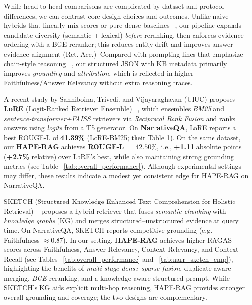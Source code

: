 \documentclass[10pt,twocolumn,letterpaper]{article}
\begin{document}
\vspace{0.5em}
While head‑to‑head comparisons are complicated by dataset and protocol differences, we can contrast core design choices and outcomes. Unlike naive hybrids that linearly mix scores or pure dense baselines ~\cite{gao2021retrieval}, our pipeline expands candidate diversity (semantic + lexical) \emph{before} reranking, then enforces evidence ordering with a BGE reranker; this reduces entity drift and improves answer–evidence alignment (Ret. Acc.). Compared with prompting lines that emphasize chain‑style reasoning ~\cite{wei2022chain,liu2023chained}, our structured JSON with KB metadata primarily improves \emph{grounding} and \emph{attribution}, which is reflected in higher Faithfulness/Answer Relevancy without extra reasoning traces.

\vspace{0.5em}
A recent study by Sanniboina, Trivedi, and Vijayaraghavan (UIUC) proposes \textbf{LoRE} (Logit‑Ranked Retriever Ensemble) ~\cite{lore2024}, which ensembles \emph{BM25} and \emph{sentence‑transformer+FAISS} retrievers via \emph{Reciprocal Rank Fusion} and ranks answers using \emph{logits} from a T5 generator. On \textbf{NarrativeQA}, LoRE reports a best ROUGE‑L of \textbf{41.39\%} (LoRE‑BM25; their Table 1). On the same dataset, our \textbf{HAPE‑RAG} achieves \textbf{ROUGE‑L $=42.50\%$}, i.e., \textbf{+1.11} absolute points (\textbf{+2.7\%} relative) over LoRE’s best, while also maintaining strong grounding metrics (see Table ~\ref{tab:overall_performance}). Although experimental settings may differ, these results indicate a modest yet consistent edge for HAPE‑RAG on NarrativeQA.

\vspace{0.5em}
SKETCH (Structured Knowledge Enhanced Text Comprehension for Holistic Retrieval) ~\cite{sketch2024} proposes a hybrid retriever that fuses \emph{semantic chunking} with \emph{knowledge graphs} (KG) and merges structured–unstructured evidence at query time. On NarrativeQA, SKETCH reports competitive grounding (e.g., Faithfulness $\approx 0.87$). In our setting, \textbf{HAPE‑RAG} achieves higher RAGAS scores across Faithfulness, Answer Relevancy, Context Relevancy, and Context Recall (see Tables ~\ref{tab:overall_performance} and ~\ref{tab:narr_sketch_cmp}), highlighting the benefits of \emph{multi‑stage dense–sparse fusion}, duplicate‑aware merging, \emph{BGE} reranking, and a knowledge‑aware structured prompt. While SKETCH’s KG aids explicit multi‑hop reasoning, HAPE‑RAG provides stronger overall grounding and coverage; the two designs are complementary.
\end{document}
